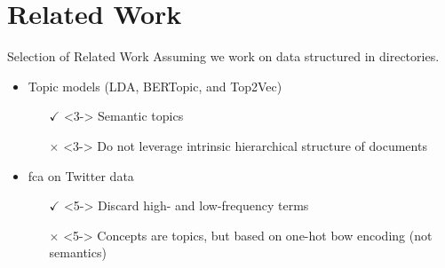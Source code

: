 \section{Related Work}



\begin{frame}{Selection of Related Work}
    Assuming we work on data structured in directories.
    \begin{itemize}
        \item<2-> Topic models (LDA, BERTopic, and Top2Vec)
        \begin{itemize}
            \item[$\checkmark$]<3-> Semantic topics
            \item[$\times$]<3-> Do not leverage intrinsic hierarchical structure of documents
        \end{itemize}

        \item<4-> \acs{fca} on Twitter data~\parencite{twitter_fca_2016}
        \begin{itemize}
            \item[$\checkmark$]<5-> Discard high- and low-frequency terms
            \item[$\times$]<5-> Concepts are topics, but based on one-hot \ac{bow} encoding (not semantics)
        \end{itemize}
      
    \end{itemize}
\end{frame}



